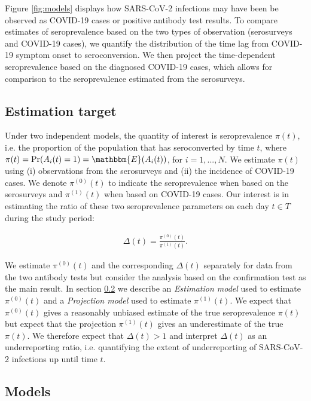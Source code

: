 \documentclass[aoas]{imsart}
\begin{document}
Figure \ref{fig:models} displays how SARS-CoV-2 infections may have been be observed as COVID-19 cases or positive antibody test results. To compare estimates of seroprevalence based on the two types of observation (serosurveys and COVID-19 cases), we quantify the distribution of the time lag from COVID-19 symptom onset to seroconversion. We then project the time-dependent seroprevalence based on the diagnosed COVID-19 cases, which allows for comparison to the seroprevalence estimated from the serosurveys.


\subsection{Estimation target}

Under two independent models, the quantity of interest is seroprevalence $\pi(t)$, i.e. the proportion of the population that has seroconverted by time $t$, where $\pi(t) = \Pr(A_i(t) = 1) = \mathbbm{E}(A_i(t))$, for $i = 1, ..., N$. We estimate $\pi(t)$ using (i) observations from the serosurveys and (ii) the incidence of COVID-19 cases. We denote $\pi^{(0)}(t)$ to indicate the seroprevalence when based on the serosurveys and $\pi^{(1)}(t)$ when based on COVID-19 cases. Our interest is in estimating the ratio of these two seroprevalence parameters on each day $t \in T$ during the study period: 

\begin{equation}\label{eq:ratio}
\begin{split}
\Delta(t) = \frac{\pi^{(0)}(t)}{\pi^{(1)}(t)}.
\end{split}
\end{equation}

We estimate $\pi^{(0)}(t)$ and the corresponding $\Delta(t)$ separately for data from the two antibody tests but consider the analysis based on the confirmation test as the main result. In section \ref{seq:Models} we describe an \emph{Estimation model} used to estimate $\pi^{(0)}(t)$ and a \emph{Projection model} used to estimate $\pi^{(1)}(t)$.  We expect that $\pi^{(0)}(t)$ gives a reasonably unbiased estimate of the true seroprevalence $\pi(t)$ but expect that the projection $\pi^{(1)}(t)$ gives an underestimate of the true $\pi(t)$. We therefore expect that $\Delta(t) > 1$ and interpret $\Delta(t)$ as an underreporting ratio, i.e. quantifying the extent of underreporting of SARS-CoV-2 infections up until time $t$. 

\subsection{Models} \label{seq:Models}
\end{document}
